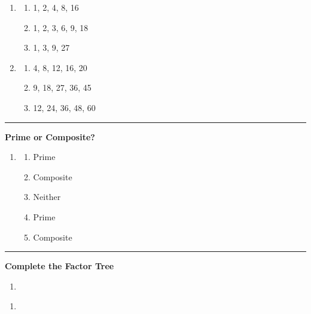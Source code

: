 \documentclass[
  letterpaper,
  DIV=11,
  numbers=noendperiod]{scrreprt}
\providecommand{\tightlist}{%
  \setlength{\itemsep}{0pt}\setlength{\parskip}{0pt}}
\begin{document}
\begin{enumerate}
\def\labelenumi{\arabic{enumi}.}
\tightlist
\item
  \begin{enumerate}
  \def\labelenumii{\alph{enumii}.}
  \tightlist
  \item
    1, 2, 4, 8, 16
  \item
    1, 2, 3, 6, 9, 18
  \item
    1, 3, 9, 27
  \end{enumerate}
\item
  \begin{enumerate}
  \def\labelenumii{\alph{enumii}.}
  \tightlist
  \item
    4, 8, 12, 16, 20
  \item
    9, 18, 27, 36, 45
  \item
    12, 24, 36, 48, 60
  \end{enumerate}
\end{enumerate}

\begin{center}\rule{0.5\linewidth}{0.5pt}\end{center}

\textbf{Prime or Composite?}

\begin{enumerate}
\def\labelenumi{\arabic{enumi}.}
\setcounter{enumi}{2}
\tightlist
\item
  \begin{enumerate}
  \def\labelenumii{\alph{enumii}.}
  \tightlist
  \item
    Prime
  \item
    Composite
  \item
    Neither
  \item
    Prime
  \item
    Composite
  \end{enumerate}
\end{enumerate}

\begin{center}\rule{0.5\linewidth}{0.5pt}\end{center}

\textbf{Complete the Factor Tree}

\begin{enumerate}
\def\labelenumi{\arabic{enumi}.}
\setcounter{enumi}{3}
\tightlist
\item
\end{enumerate}

\begin{enumerate}
\def\labelenumi{\alph{enumi}.}
\tightlist
\item
\end{enumerate}
\end{document}
